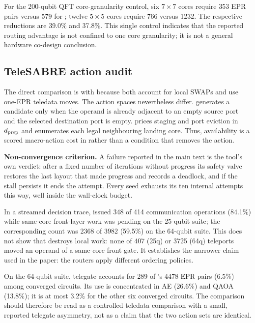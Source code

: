 For the 200-qubit QFT core-granularity control, six $7\times7$ cores require
353 EPR pairs versus 579 for \TeleSABRE{}; twelve $5\times5$ cores require
766 versus 1232.  The respective reductions are 39.0\% and 37.8\%.  This
single control indicates that the reported routing advantage is not confined
to one core granularity; it is not a general hardware co-design conclusion.

\subsection{TeleSABRE action audit}
\label{app:telesabre}
The direct comparison is with \TeleSABRE{} because both account for local
SWAPs and use one-EPR teledata moves.  The action spaces nevertheless differ.
\TeleSABRE{} generates a candidate only when the operand is already adjacent
to an empty source port and the selected destination port is empty.  \dSABRE{}
prices staging and port eviction in $d_{\rm prep}$ and enumerates each legal
neighbouring landing core.  Thus, availability is a scored macro-action cost
in \dSABRE{} rather than a condition that removes the action.

\textbf{Non-convergence criterion.}  A \TeleSABRE{} failure reported in the
main text is the tool's own verdict: after a fixed number of iterations
without progress its safety valve restores the last layout that made
progress and records a deadlock, and if the stall persists it ends the
attempt.  Every seed exhausts its ten internal attempts this way, well
inside the wall-clock budget.

In a streamed decision trace, \TeleSABRE{} issued 348 of 414 communication
operations (84.1\%) while same-core front-layer work was pending on the
25-qubit suite; the corresponding count was 2368 of 3982 (59.5\%) on the
64-qubit suite.  This does not show that \TeleSABRE{} destroys local work:
none of 407 (25q) or 3725 (64q) teleports moved an operand of a same-core
front gate.  It establishes the narrower claim used in the paper: the routers
apply different ordering policies.

On the 64-qubit suite, telegate accounts for 289 of \TeleSABRE{}'s 4478 EPR
pairs (6.5\%) among converged circuits.  Its use is concentrated in AE
(26.6\%) and QAOA (13.8\%); it is at most 3.2\% for the other six converged
circuits.  The comparison should therefore be read as a controlled teledata
comparison with a small, reported telegate asymmetry, not as a claim that the
two action sets are identical.

